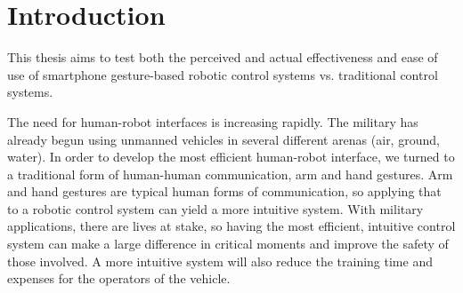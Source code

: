 \documentclass[12pt,a4paper]{report}
\begin{document}
\chapter{Introduction}
\pagestyle{headings}
\setcounter{page}{1}

This thesis aims to test both the perceived and actual effectiveness and ease of use of smartphone gesture-based robotic control systems vs. traditional control systems.

The need for human-robot interfaces is increasing rapidly. The military has already begun using unmanned vehicles in several different arenas (air, ground, water). In order to develop the most efficient human-robot interface, we turned to a traditional form of human-human communication, arm and hand gestures. Arm and hand gestures are typical human forms of communication, so applying that to a robotic control system can yield a more intuitive system. With military applications, there are lives at stake, so having the most efficient, intuitive control system can make a large difference in critical moments and improve the safety of those involved. A more intuitive system will also reduce the training time and expenses for the operators of the vehicle.

 
\end{document}

